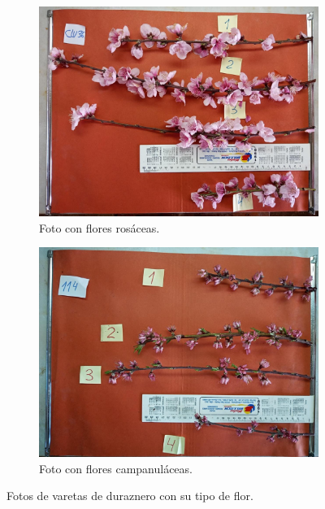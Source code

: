 \begin{figure}[ht]
     \centering
     \begin{subfigure}[b]{0.45\textwidth}
         \centering
         \includegraphics[scale=.13]{./Figures/flor_rosacea.jpg}
         \caption{Foto con flores rosáceas.}
         \label{fig:1de23}
     \end{subfigure}
     \hfill
     \begin{subfigure}[b]{0.45\textwidth}
         \centering
         \includegraphics[scale=.13]{./Figures/flor_camp.jpg}
         \caption{Foto con flores campanuláceas.}
         \label{fig:2de23}
     \end{subfigure}
        \caption{Fotos de varetas de duraznero con su tipo de flor.}
        \label{fig:two graphs}
\end{figure}

